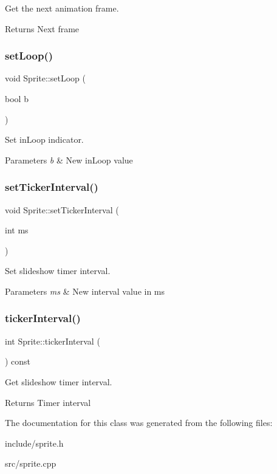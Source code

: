 Get the next animation frame. 

\begin{DoxyReturn}{Returns}
Next frame 
\end{DoxyReturn}
\mbox{\label{class_sprite_a37869d23b6c3884f6ff856680e2c2e30}} 
\subsubsection{\texorpdfstring{set\+Loop()}{setLoop()}}
{\footnotesize\ttfamily void Sprite\+::set\+Loop (\begin{DoxyParamCaption}\item[{bool}]{b }\end{DoxyParamCaption})}



Set in\+Loop indicator. 


\begin{DoxyParams}{Parameters}
{\em b} & New in\+Loop value \\
\hline
\end{DoxyParams}
\mbox{\label{class_sprite_af46f090f361ddf8fe868091be338d2a8}} 
\subsubsection{\texorpdfstring{set\+Ticker\+Interval()}{setTickerInterval()}}
{\footnotesize\ttfamily void Sprite\+::set\+Ticker\+Interval (\begin{DoxyParamCaption}\item[{int}]{ms }\end{DoxyParamCaption})}



Set slideshow timer interval. 


\begin{DoxyParams}{Parameters}
{\em ms} & New interval value in ms \\
\hline
\end{DoxyParams}
\mbox{\label{class_sprite_a90bbd615de28db60579c4d09e2bb3f39}} 
\subsubsection{\texorpdfstring{ticker\+Interval()}{tickerInterval()}}
{\footnotesize\ttfamily int Sprite\+::ticker\+Interval (\begin{DoxyParamCaption}{ }\end{DoxyParamCaption}) const}



Get slideshow timer interval. 

\begin{DoxyReturn}{Returns}
Timer interval 
\end{DoxyReturn}


The documentation for this class was generated from the following files\+:\begin{DoxyCompactItemize}
\item 
include/sprite.\+h\item 
src/sprite.\+cpp\end{DoxyCompactItemize}
